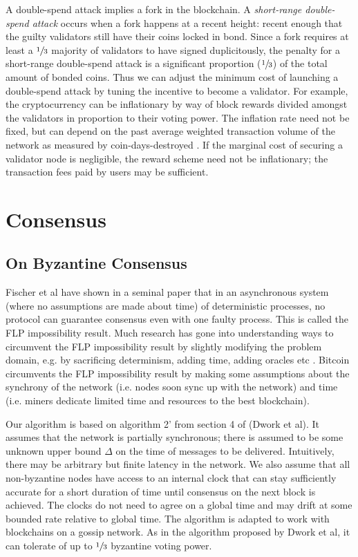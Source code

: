 \documentclass[letter,11pt]{article}
\begin{document}
A double-spend attack implies a fork in the blockchain. A \textit{short-range double-spend attack} occurs when a fork happens at a recent height: recent enough that the guilty validators still have their coins locked in bond. Since a fork requires at least a $\sfrac{1}{3}$ majority of validators to have signed duplicitously, the penalty for a short-range double-spend attack is a significant proportion ($\sfrac{1}{3}$) of the total amount of bonded coins. Thus we can adjust the minimum cost of launching a double-spend attack by tuning the incentive to become a validator. For example, the cryptocurrency can be inflationary by way of block rewards divided amongst the validators in proportion to their voting power. The inflation rate need not be fixed, but can depend on the past average weighted transaction volume of the network as measured by coin-days-destroyed \cite{conf:daysdestroyed}. If the marginal cost of securing a validator node is negligible, the reward scheme need not be inflationary; the transaction fees paid by users may be sufficient.


\section{Consensus} %

\subsection{On Byzantine Consensus} %

Fischer et al have shown in a seminal paper \cite{article:fischer} that in an asynchronous system (where no assumptions are made about time) of deterministic processes, no protocol can guarantee consensus even with one faulty process. This is called the FLP impossibility result. Much research has gone into understanding ways to circumvent the FLP impossibility result by slightly modifying the problem domain, e.g. by sacrificing determinism, adding time, adding oracles etc \cite{article:correia}. Bitcoin circumvents the FLP impossibility result by making some assumptions about the synchrony of the network (i.e. nodes soon sync up with the network) and time (i.e. miners dedicate limited time and resources to the best blockchain).

Our algorithm is based on algorithm 2’ from section 4 of \cite{article:dwork} (Dwork et al). It assumes that the network is partially synchronous; there is assumed to be some unknown upper bound $\Delta$ on the time of messages to be delivered. Intuitively, there may be arbitrary but finite latency in the network. We also assume that all non-byzantine nodes have access to an internal clock that can stay sufficiently accurate for a short duration of time until consensus on the next block is achieved. The clocks do not need to agree on a global time and may drift at some bounded rate relative to global time. The algorithm is adapted to work with blockchains on a gossip network. As in the algorithm proposed by Dwork et al, it can tolerate of up to $\sfrac{1}{3}$ byzantine voting power.
\end{document}
